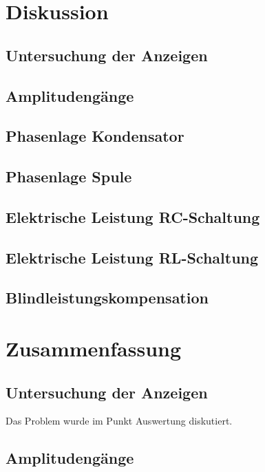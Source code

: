 \documentclass[12pt,a4paper,twoside]{article}
\begin{document}
\section{Diskussion} %

\subsection{Untersuchung der Anzeigen}
\subsection{Amplitudengänge}
\subsection{Phasenlage Kondensator}
\subsection{Phasenlage Spule}
\subsection{Elektrische Leistung RC-Schaltung}
\subsection{Elektrische Leistung RL-Schaltung}
\subsection{Blindleistungskompensation}



\section{Zusammenfassung} %

\subsection{Untersuchung der Anzeigen}

Das Problem wurde im Punkt Auswertung diskutiert.


\subsection{Amplitudengänge}
\end{document}
